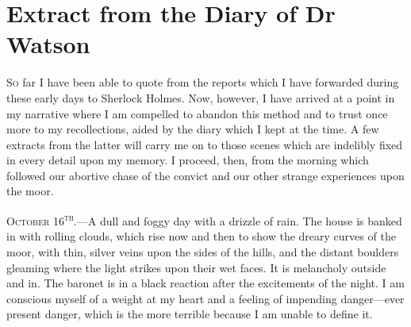 \chapter{Extract from the Diary of Dr Watson}
\lettrine[lines=1]{S}{o} far I have been able to quote from the reports which I have forwarded during these early days to Sherlock Holmes. Now, however, I have arrived at a point in my narrative where I am compelled to abandon this method and to trust once more to my recollections, aided by the diary which I kept at the time. A few extracts from the latter will carry me on to those scenes which are indelibly fixed in every detail upon my memory. I proceed, then, from the morning which followed our abortive chase of the convict and our other strange experiences upon the moor.
\vfill

\textsc{October 16\textsuperscript{th}.}\allowbreak---\allowbreak A dull and foggy day with a drizzle of rain. The house is banked in with rolling clouds, which rise now and then to show the dreary curves of the moor, with thin, silver veins upon the sides of the hills, and the distant boulders gleaming where the light strikes upon their wet faces. It is melancholy outside and in. The baronet is in a black reaction after the excitements of the night. I am conscious myself of a weight at my heart and a feeling of impending danger\allowbreak---\allowbreak ever present danger, which is the more terrible because I am unable to define it.

